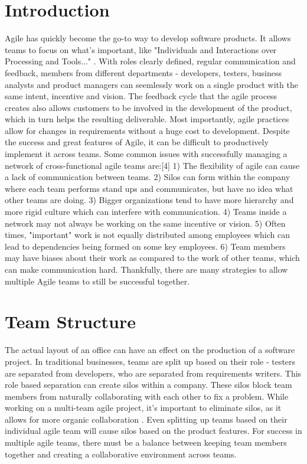 \documentclass[sigplan,screen]{acmart}
\begin{document}
\section{Introduction}
Agile has quickly become the go-to way to develop software products.
It allows teams to focus on what's important, like "Individuals and Interactions over Processing and Tools..." \cite{b3}. 
With roles clearly defined, regular communication and feedback, members from different departments - developers, testers, business analysts and product managers can seemlessly work on a single product with the same intent, incentive and vision.
The feedback cycle that the agile process creates also allows customers to be involved in the development of the product, which in turn helps the resulting deliverable.
Most importantly, agile practices allow for changes in requirements without a huge cost to development.
Despite the success and great features of Agile, it can be difficult to productively implement it across teams.
Some common issues with successfully managing a network of cross-functional agile teams are:[4]
1) The flexibility of agile can cause a lack of communication between teams. 2) Silos can form within the company where each team performs stand ups and communicates, but have no idea what other teams are doing.
3) Bigger organizations tend to have more hierarchy and more rigid culture which can interfere with communication. 4) Teams inside a network may not always be working on the same incentive or vision. 5) Often times, "important" work is not equally distributed among employees which can lead to dependencies being formed on some key employees.
6) Team members may have biases about their work as compared to the work of other teams, which can make communication hard.
Thankfully, there are many strategies to allow multiple Agile teams to still be successful together.

\section{Team Structure}
The actual layout of an office can have an effect on the production of a software project.
In traditional businesses, teams are split up based on their role - testers are separated from developers, who are separated from requirements writers.
This role based separation can create silos within a company. 
These silos block team members from naturally collaborating with each other to fix a problem.
While working on a multi-team agile project, it's important to eliminate silos, as it allows for more organic collaboration \cite{b1}.
Even splitting up teams based on their individual agile team will cause silos based on the product features.
For success in multiple agile teams, there must be a balance between keeping team members together and creating a collaborative environment across teams.
\end{document}
